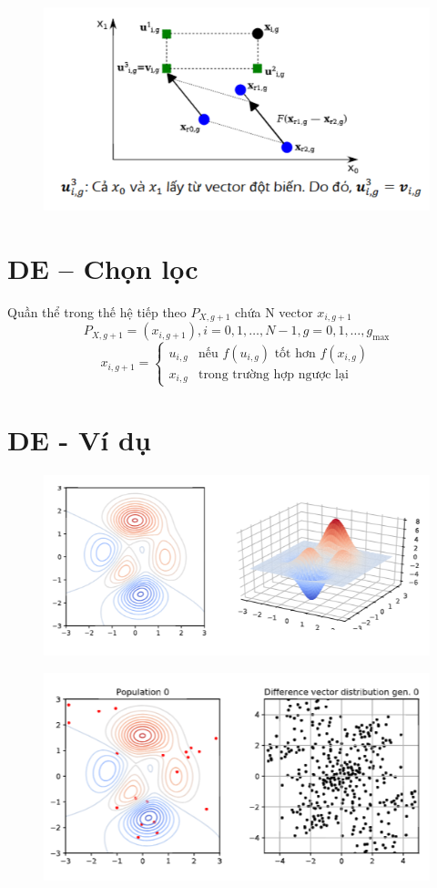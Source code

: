 \documentclass{book}
\begin{document}
\begin{figure}[H]
    \centering
    \includegraphics[width=1\linewidth]{images/GA-3_9.png}
\end{figure}

\section{DE – Chọn lọc}

Quần thể trong thế hệ tiếp theo $P_{X,g+1}$ chứa N vector $x_{i,g+1}$
$$ P_{X,g+1} = (x_{i,g+1}), i = 0,1, \dots, N-1, g = 0,1, \dots, g_{\max} $$
$$ x_{i,g+1} = \begin{cases}
u_{i,g} & \text{nếu } f(u_{i,g}) \text{ tốt hơn } f(x_{i,g}) \\
x_{i,g} & \text{trong trường hợp ngược lại}
\end{cases} $$

\section{DE - Ví dụ}
\begin{figure}[H]
    \centering
    \includegraphics[width=0.75\linewidth]{images/GA-3_10.png}
\end{figure}

\begin{figure}[H]
    \centering
    \includegraphics[width=0.75\linewidth]{images/GA-3_11.png}
\end{figure}
\end{document}
